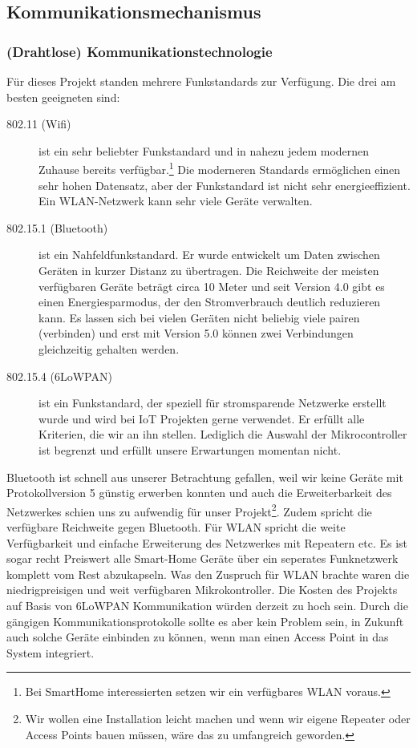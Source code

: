 \documentclass[a4paper,10pt,twocolumn]{article}
\begin{document}
\subsection{Kommunikationsmechanismus}
\subsubsection{(Drahtlose) Kommunikationstechnologie}
Für dieses Projekt standen mehrere Funkstandards zur Verfügung. Die drei am besten geeigneten sind:
\begin{description}
\item[802.11 (Wifi)] 
ist ein sehr beliebter Funkstandard und in nahezu jedem modernen Zuhause bereits verfügbar.\footnote{Bei SmartHome interessierten setzen wir ein verfügbares WLAN voraus.} Die moderneren Standards ermöglichen einen sehr hohen Datensatz, aber der Funkstandard ist nicht sehr energieeffizient. Ein WLAN-Netzwerk kann sehr viele Geräte verwalten.
\item[802.15.1 (Bluetooth)]
ist ein Nahfeldfunkstandard. Er wurde entwickelt um Daten zwischen Geräten in kurzer Distanz zu übertragen. Die Reichweite der meisten verfügbaren Geräte beträgt circa 10 Meter und seit Version 4.0 gibt es einen Energiesparmodus, der den Stromverbrauch deutlich reduzieren kann. Es lassen sich bei vielen Geräten nicht beliebig viele pairen (verbinden) und erst mit Version 5.0 können zwei Verbindungen gleichzeitig gehalten werden.
\item[802.15.4 (6LoWPAN)]
ist ein Funkstandard, der speziell für stromsparende Netzwerke erstellt wurde und wird bei IoT Projekten gerne verwendet. Er erfüllt alle Kriterien, die wir an ihn stellen. Lediglich die Auswahl der Mikrocontroller ist begrenzt und erfüllt unsere Erwartungen momentan nicht.
\end{description}

Bluetooth ist schnell aus unserer Betrachtung gefallen, weil wir keine Geräte mit Protokollversion 5 günstig erwerben konnten und auch die Erweiterbarkeit des Netzwerkes schien uns zu aufwendig für unser Projekt\footnote{Wir wollen eine Installation leicht machen und wenn wir eigene Repeater oder Access Points bauen müssen, wäre das zu umfangreich geworden.}. Zudem spricht die verfügbare Reichweite gegen Bluetooth. Für WLAN spricht die weite Verfügbarkeit und einfache Erweiterung des Netzwerkes mit Repeatern etc. Es ist sogar recht Preiswert alle Smart-Home Geräte über ein seperates Funknetzwerk komplett vom Rest abzukapseln. Was den Zuspruch für WLAN brachte waren die niedrigpreisigen und weit verfügbaren Mikrokontroller. Die Kosten des Projekts auf Basis von 6LoWPAN Kommunikation würden derzeit zu hoch sein. Durch die gängigen Kommunikationsprotokolle sollte es aber kein Problem sein, in Zukunft auch solche Geräte einbinden zu können, wenn man einen Access Point in das System integriert.
\end{document}
